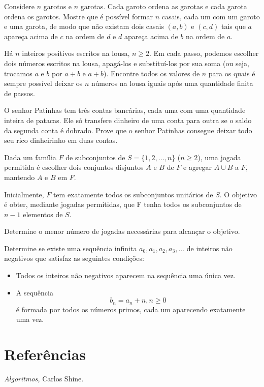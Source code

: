 \documentclass[10pt,a4paper]{article}
\begin{document}
	\begin{prob}
		Considere $n$ garotos e $n$ garotas.
		Cada garoto ordena as garotas e cada garota ordena os garotos.
		Mostre que é possível formar $n$ casais, cada um com um garoto e uma garota, de modo que não existam dois casais $(a, b)$ e $(c, d)$ tais que $a$ apareça acima de $c$ na ordem de $d$ e $d$ apareça acima de $b$ na ordem de $a$.
	\end{prob}

	\begin{prob}
		Há $n$ inteiros positivos escritos na lousa, $n \ge 2$.
		Em cada passo, podemos escolher dois números escritos na lousa, apagá-los e substituí-los por sua soma (ou seja, trocamos $a$ e $b$ por $a + b$ e $a + b$).
		Encontre todos os valores de $n$ para os quais é sempre possível deixar os $n$ números na lousa iguais após uma quantidade finita de passos.
	\end{prob}

	\begin{prob}
		O senhor Patinhas tem três contas bancárias, cada uma com uma quantidade inteira de patacas.
		Ele só transfere dinheiro de uma conta para outra se o saldo da segunda conta é dobrado.
		Prove que o senhor Patinhas consegue deixar todo seu rico dinheirinho em duas contas.
	\end{prob}

	\begin{prob}
		Dada um família $F$ de subconjuntos de $S = \{1, 2, . . . , n\}$ ($n \ge 2$), uma jogada permitida é escolher dois conjuntos disjuntos $A$ e $B$ de $F$ e agregar $A \cup B$ a $F$, mantendo $A$ e $B$ em $F$.
		
		Inicialmente, $F$ tem exatamente todos os subconjuntos unitários de $S$. O objetivo é obter, mediante jogadas permitidas, que F tenha todos os subconjuntos de $n - 1$ elementos de $S$.

		Determine o menor número de jogadas necessárias para alcançar o objetivo.
	\end{prob}

	\begin{prob}
		Determine se existe uma sequência infinita $a_0, a_1, a_2, a_3, \dots$ de inteiros não negativos que satisfaz as seguintes condições:
		\begin{itemize}
			\item Todos os inteiros não negativos aparecem na sequência uma única vez.
			\item A sequência $$b_n = a_n + n, n \ge 0$$ é formada por todos os números primos, cada um aparecendo exatamente uma vez.
		\end{itemize}
	\end{prob}





	\newpage
	\section*{Referências}
	\begin{enumerate}[label = { [\arabic*] }]
		\item \emph{Algoritmos,} Carlos Shine.
	\end{enumerate}
\end{document}

